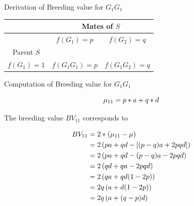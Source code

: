 \documentclass[ignorenonframetext,]{beamer}
\begin{document}
\begin{frame}{Derivation of Breeding value for \(G_1G_1\)}
\protect\hypertarget{derivation-of-breeding-value-for-g_1g_1}{}

\begin{center}
   {\renewcommand{\arraystretch}{1.7}
   \renewcommand{\tabcolsep}{0.2cm}
   \begin{tabular}{|c|c|c|}
\hline
& \multicolumn{2}{|c|}{Mates of $S$} \\
\hline
& $f(G_1) = p$       &  $f(G_2) = q$   \\
\hline
Parent $S$       &                    &                 \\
\hline
$f(G_1) = 1$ &  $f(G_1G_1) = p$   &  $f(G_1G_2) = q$\\
\hline
\end{tabular}}
\end{center}

\end{frame}

\begin{frame}{Computation of Breeding value for \(G_1G_1\)}
\protect\hypertarget{computation-of-breeding-value-for-g_1g_1}{}

\begin{equation}
\mu_{11} = p*a + q*d \notag
\end{equation}

The breeding value \(BV_{11}\) corresponds to

\begin{align}
BV_{11} &=  2*(\mu_{11} - \mu)  \notag \\
        &=  2\left(pa + qd - \left[(p - q)a + 2pqd \right] \right) \notag\\
        &=  2\left(pa + qd - (p - q)a - 2pqd \right) \notag\\
        &=  2\left(qd + qa - 2pqd\right) \notag \\
        &=  2\left(qa + qd(1 - 2p)\right) \notag \\
        &=  2q\left(a + d(1 - 2p)\right) \notag \\
        &=  2q\left(a + (q-p)d\right) \notag
\end{align}

\end{frame}
\end{document}
